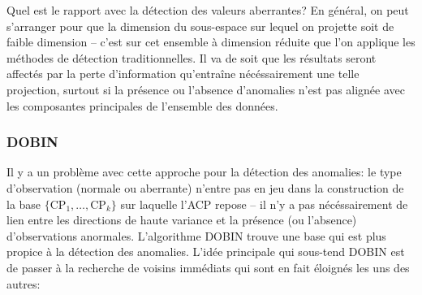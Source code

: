 \newl Quel est le rapport avec la d\'etection des valeurs aberrantes? En g\'en\'eral, on peut s'arranger pour que la dimension du sous-espace sur lequel on projette soit de faible dimension -- c'est sur cet ensemble \`a dimension r\'eduite que l'on applique les m\'ethodes de d\'etection traditionnelles. Il va de soit que les r\'esultats seront affect\'es par la perte d'information qu'entra\^ine n\'ec\'essairement une telle projection, surtout si la présence ou l'absence d'anomalies n'est pas align\'ee avec les composantes principales de l'ensemble des donn\'ees. 

\subsubsection*{DOBIN}
Il y a un probl\`eme avec cette approche pour la d\'etection des anomalies: le type d'observation (normale ou aberrante) n'entre pas en jeu dans la construction de la base $\{\text{CP}_1,\ldots,\text{CP}_k\}$ sur laquelle l'ACP repose -- il n'y a pas n\'ec\'essairement de lien entre les directions de haute variance et la pr\'esence (ou l'absence) d'observations anormales. 
\newl 
L'algorithme DOBIN trouve une base qui est plus propice \`a la d\'etection des anomalies. L'id\'ee principale qui sous-tend DOBIN est de passer \`a la recherche de voisins imm\'ediats qui sont en fait \'eloign\'es les uns des autres: 
